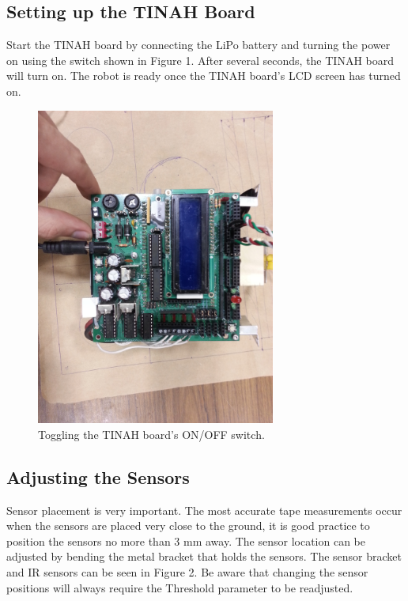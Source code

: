 \documentclass[11pt]{article}
\begin{document}
\begin{adjustwidth}{1cm}{}
\subsection{Setting up the TINAH Board}

	Start the TINAH board by connecting the LiPo battery and turning the power on using the switch shown in Figure 1. After several seconds, the TINAH board will turn on. The robot is ready once the TINAH board's LCD screen has turned on.
	
	\begin{figure}[h]
	\centering
		\includegraphics[width=0.7\textwidth]{Figures/power_switch.jpg}
		\caption{Toggling the TINAH board's ON/OFF switch.}
	\end{figure}

\subsection{Adjusting the Sensors}

Sensor placement is very important. The most accurate tape measurements occur when the sensors are placed very close to the ground, it is good practice to position the sensors no more than 3 mm away. The sensor location can be adjusted by bending the metal bracket that holds the sensors. The sensor bracket and IR sensors can be seen in Figure 2.  Be aware that changing the sensor positions will always require the Threshold parameter to be readjusted.
 

\end{adjustwidth}
\end{document}
